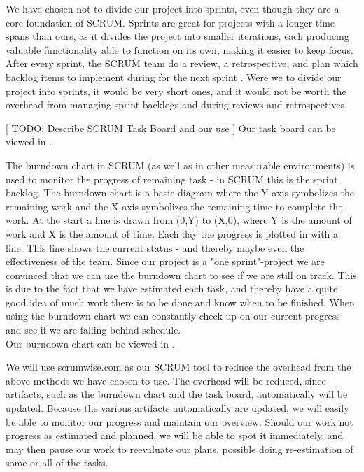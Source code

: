 We have chosen not to divide our project into sprints, even though they are a core foundation of SCRUM.
Sprints are great for projects with a longer time spans than ours, as it divides the project into smaller iterations, each producing valuable functionality able to function on its own, making it easier to keep focus.
After every sprint, the SCRUM team do a review, a retrospective, and plan which backlog items to implement during for the next sprint \cite[p. 8]{scrum-org-guide}.
Were we to divide our project into sprints, it would be very short ones, and it would not be worth the overhead from managing sprint backlogs and during reviews and retrospectives.

[ TODO: Describe SCRUM Task Board and our use ]
Our task board can be viewed in .

The burndown chart in SCRUM (as well as in other measurable environments) is used to monitor the progress of remaining task - in SCRUM this is the sprint backlog.
The burndown chart is a basic diagram where the Y-axis symbolizes the remaining work and the X-axis symbolizes the remaining time to complete the work.
At the start a line is drawn from (0,Y) to (X,0), where Y is the amount of work and X is the amount of time.
Each day the progress is plotted in with a line. This line shows the current status - and thereby maybe even the effectiveness of the team.
Since our project is a "one sprint"-project we are convinced that we can use the burndown chart to see if we are still on track. This is due to the fact that we have estimated each task, and thereby have a quite good idea of much work there is to be done and know when to be finished. When using the burndown chart we can constantly check up on our current progress and see if we are falling behind schedule.\\
Our burndown chart can be viewed in .

We will use scrumwise.com as our SCRUM tool to reduce the overhead from the above methods we have chosen to use. The overhead will be reduced, since artifacts, such as the burndown chart and the task board, automatically will be updated.
Because the various artifacts automatically are updated, we will easily be able to monitor our progress and maintain our overview. Should our work not progress as estimated and planned, we will be able to spot it immediately, and may then pause our work to reevaluate our plans, possible doing re-estimation of some or all of the tasks.